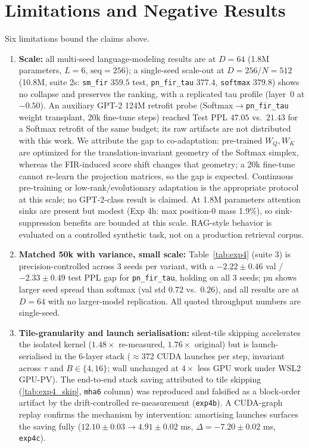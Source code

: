 \documentclass[11pt,a4paper]{article}
\begin{document}
\section{Limitations and Negative Results}
\label{sec:limitations}
Six limitations bound the claims above.
\begin{enumerate}
\item\sloppy \textbf{Scale:} all multi-seed language-modeling results are at $D{=}64$ (1.8M parameters, $L=6$, $\text{seq}{=}256$); a single-seed scale-out at $D{=}256$/$N{=}512$ (10.8M, suite 2s: \texttt{sm\_fir} $359.5$ test, \texttt{pn\_fir\_tau} $377.4$, \texttt{softmax} $379.8$) shows no collapse and preserves the ranking, with a replicated tau profile (layer~0 at $-0.50$). An auxiliary GPT-2 124M retrofit probe (Softmax$\to$\texttt{pn\_fir\_tau} weight transplant, 20k fine-tune steps) reached Test PPL $47.05$ vs.\ $21.43$ for a Softmax retrofit of the same budget; its raw artifacts are not distributed with this work. We attribute the gap to co-adaptation: pre-trained $W_Q,W_K$ are optimized for the translation-invariant geometry of the Softmax simplex, whereas the FIR-induced score shift changes that geometry; a 20k fine-tune cannot re-learn the projection matrices, so the gap is expected. Continuous pre-training or low-rank/evolutionary adaptation is the appropriate protocol at this scale; no GPT-2-class result is claimed. At 1.8M parameters attention sinks are present but modest (Exp 4h: max position-0 mass 1.9\%), so sink-suppression benefits are bounded at this scale. RAG-style behavior is evaluated on a controlled synthetic task, not on a production retrieval corpus.
\item \textbf{Matched 50k with variance, small scale:} Table~\ref{tab:exp4} (suite 3) is precision-controlled across 3 seeds per variant, with a $-2.22 \pm 0.46$ val / $-2.33 \pm 0.49$ test PPL gap for \texttt{pn\_fir\_tau}, holding on all 3 seeds; pn shows larger seed spread than softmax (val std $0.72$ vs.\ $0.26$), and all results are at $D{=}64$ with no larger-model replication. All quoted throughput numbers are single-seed.
\item \textbf{Tile-granularity and launch serialisation:} silent-tile skipping accelerates the isolated kernel ($1.48\times$ re-measured, $1.76\times$ original) but is launch-serialised in the 6-layer stack ($\approx$372 CUDA launches per step, invariant across $\tau$ and $B \in \{4,16\}$; wall unchanged at $4\times$ less GPU work under WSL2 GPU-PV). The end-to-end stack saving attributed to tile skipping (\ref{tab:exp4_skip}, \texttt{mha6} column) was reproduced and falsified as a block-order artifact by the drift-controlled re-measurement (\texttt{exp4b}). A CUDA-graph replay confirms the mechanism by intervention: amortising launches surfaces the saving fully ($12.10 \pm 0.03 \to 4.91 \pm 0.02$ ms, $\Delta = -7.20 \pm 0.02$ ms, \texttt{exp4c}).

\end{enumerate}
\end{document}
